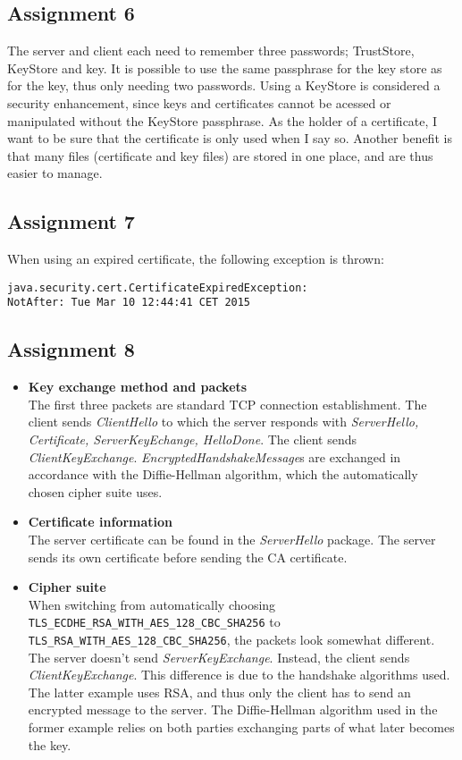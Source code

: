 \documentclass[11pt,a4paper]{article}
\begin{document}
\subsection{Assignment 6}
The server and client each need to remember three passwords; TrustStore, KeyStore and key. It is possible to use the same passphrase for the key store as for the key, thus only needing two passwords. Using a KeyStore is considered a security enhancement, since keys and certificates cannot be acessed or manipulated without the KeyStore passphrase. As the holder of a certificate, I want to be sure that the certificate is only used when I say so. Another benefit is that many files (certificate and key files) are stored in one place, and are thus easier to manage.
\subsection{Assignment 7}
When using an expired certificate, the following exception is thrown:
\begin{verbatim}
java.security.cert.CertificateExpiredException:
NotAfter: Tue Mar 10 12:44:41 CET 2015
\end{verbatim}

\subsection{Assignment 8} 
\begin{itemize}
\item \textbf{Key exchange method and packets}\\The first three packets are standard TCP connection establishment. The client sends \textit{ClientHello} to which the server responds with \textit{ServerHello, Certificate, ServerKeyEchange, HelloDone}. The client sends \textit{ClientKeyExchange}. \textit{EncryptedHandshakeMessage}s are exchanged in accordance with the Diffie-Hellman algorithm, which the automatically chosen cipher suite uses.
\item \textbf{Certificate information}\\
The server certificate can be found in the \textit{ServerHello} package. The server sends its own certificate before sending the CA certificate.
\item \textbf{Cipher suite}\\
When switching from automatically choosing \texttt{TLS\_ECDHE\_RSA\_WITH\_AES\_128\_CBC\_SHA256} to
\texttt{TLS\_RSA\_WITH\_AES\_128\_CBC\_SHA256}, the packets look somewhat different. The server doesn't send \textit{ServerKeyExchange}. Instead, the client sends \textit{ClientKeyExchange}. This difference is due to the handshake algorithms used. The latter example uses RSA, and thus only the client has to send an encrypted message to the server. The Diffie-Hellman algorithm used in the former example relies on both parties exchanging parts of what later becomes the key.
\end{itemize}
\end{document}
